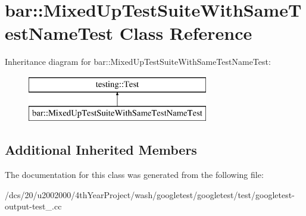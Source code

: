 \hypertarget{classbar_1_1MixedUpTestSuiteWithSameTestNameTest}{}\section{bar\+:\+:Mixed\+Up\+Test\+Suite\+With\+Same\+Test\+Name\+Test Class Reference}
\label{classbar_1_1MixedUpTestSuiteWithSameTestNameTest}
Inheritance diagram for bar\+:\+:Mixed\+Up\+Test\+Suite\+With\+Same\+Test\+Name\+Test\+:\begin{figure}[H]
\begin{center}
\leavevmode
\includegraphics[height=2.000000cm]{classbar_1_1MixedUpTestSuiteWithSameTestNameTest}
\end{center}
\end{figure}
\subsection*{Additional Inherited Members}


The documentation for this class was generated from the following file\+:\begin{DoxyCompactItemize}
\item 
/dcs/20/u2002000/4th\+Year\+Project/wash/googletest/googletest/test/googletest-\/output-\/test\+\_\+.\+cc\end{DoxyCompactItemize}
